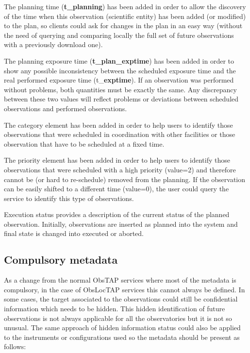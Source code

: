 \documentclass[11pt,a4paper]{ivoa}
\begin{document}
The planning time (\textbf{t\_planning}) has been added in order to allow the discovery of the time when this observation (scientific entity) has been added (or modified) to the plan, so clients could ask for changes in the plan in an easy way (without the need of querying and comparing locally the full set of future observations with a previously download one).

The planning exposure time (\textbf{t\_plan\_exptime}) has been added in order to show any possible inconsistency between the scheduled exposure time and the real performed exposure time (t\_\textbf{exptime}). If an observation was performed without problems, both quantities must be exactly the same. Any discrepancy between these two values will reflect problems or deviations between scheduled observations and performed observations.

The category element has been added in order to help users to identify those observations that were scheduled in coordination with other facilities or those observation that have to be scheduled at a fixed time.

The priority element has been added in order to help users to identify those observations that were scheduled with a high priority (value=2) and therefore cannot be (or hard to re-schedule) removed from the planning. If the observation can be easily shifted to a different time (value=0), the user could query the service to identify this type of observations.

Execution status provides a description of the current status of the planned observation. Initially, observations are inserted as planned into the system and final state is changed into executed or aborted.

\subsection{Compulsory metadata}
As a change from the normal ObsTAP services where most of the metadata is compulsory, in the case of ObsLocTAP services this cannot always be defined. In some cases, the target associated to the observations could still be confidential information which needs to be hidden. This hidden identification of future observations is not always applicable for all the observatories but it is not so unusual. The same approach of hidden information status could also be applied to the instruments or configurations used so the metadata should be present as follows:
\end{document}
